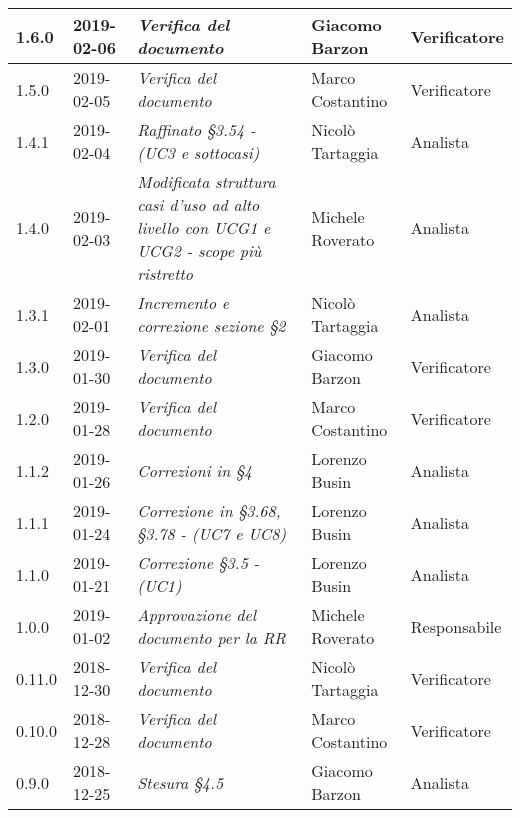 \begin{longtable}{C{2cm}|C{2.5cm}|C{4.5cm}|C{2.5cm}|C{3cm}}
		1.6.0 & 2019-02-06 & \emph{Verifica del documento} & Giacomo Barzon & Verificatore \\
		\hline
		
		1.5.0 & 2019-02-05 & \emph{Verifica del documento} & Marco Costantino & Verificatore \\
		\hline
	
		1.4.1 & 2019-02-04 & \emph{Raffinato §3.54 -  (UC3 e sottocasi)} & Nicolò Tartaggia & Analista \\
		\hline
	
		1.4.0 & 2019-02-03 & \emph{Modificata struttura casi d'uso ad alto livello con UCG1 e UCG2 - scope più ristretto} & Michele Roverato & Analista \\
		\hline
	
		1.3.1 & 2019-02-01 & \emph{Incremento e correzione sezione §2} & Nicolò Tartaggia & Analista \\
		\hline
	
		1.3.0 & 2019-01-30 & \emph{Verifica del documento} & Giacomo Barzon & Verificatore \\
		\hline
		
		1.2.0 & 2019-01-28 & \emph{Verifica del documento} & Marco Costantino & Verificatore \\
		\hline
	
		1.1.2 & 2019-01-26 & \emph{Correzioni in §4} & Lorenzo Busin & Analista \\
		\hline
	
		1.1.1 & 2019-01-24 & \emph{Correzione in §3.68, §3.78 - (UC7 e UC8)} & Lorenzo Busin & Analista \\
		\hline	
	
		1.1.0 & 2019-01-21 & \emph{Correzione §3.5 - (UC1)} & Lorenzo Busin & Analista \\
		\hline
		
		1.0.0 & 2019-01-02 & \emph{Approvazione del documento per la RR} & Michele Roverato & Responsabile \\
		\hline
		
		0.11.0 & 2018-12-30 & \emph{Verifica del documento} & Nicolò Tartaggia & Verificatore \\
		\hline
		
		0.10.0 & 2018-12-28 & \emph{Verifica del documento} & Marco Costantino & Verificatore \\
		\hline
		
		0.9.0 & 2018-12-25 & \emph{Stesura §4.5} & Giacomo Barzon & Analista \\
		\hline
		

\end{longtable}
